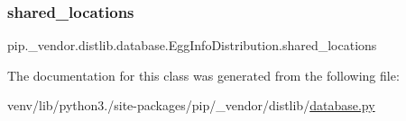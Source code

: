 \subsubsection{\texorpdfstring{shared\+\_\+locations}{shared\_locations}}
{\footnotesize\ttfamily pip.\+\_\+vendor.\+distlib.\+database.\+Egg\+Info\+Distribution.\+shared\+\_\+locations\hspace{0.3cm}{\ttfamily [static]}}



The documentation for this class was generated from the following file\+:\begin{DoxyCompactItemize}
\item 
venv/lib/python3./site-\/packages/pip/\+\_\+vendor/distlib/\hyperlink{database_8py}{database.\+py}\end{DoxyCompactItemize}

